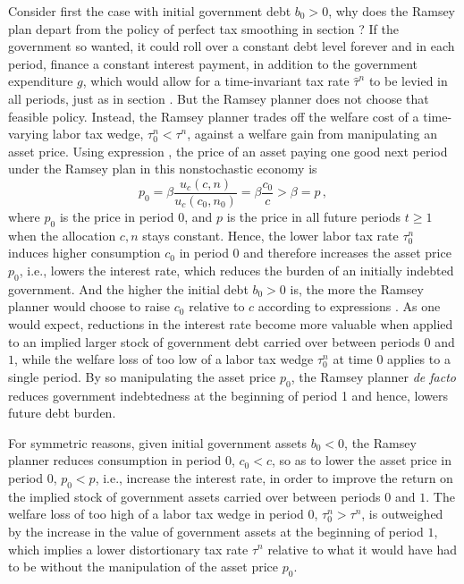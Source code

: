 Consider first the case with initial government debt $b_0>0$, why 
does the Ramsey plan depart from the policy of perfect tax 
smoothing in section ? If the government 
so wanted, it could roll over a constant debt level forever and 
in each period, finance a constant interest payment, in 
addition to the government expenditure $g$, which would
allow for a time-invariant tax rate $\hat \tau^n$ to be levied
in all periods, just as in section . But the 
Ramsey planner does not choose that feasible policy. Instead, the 
Ramsey planner trades off the welfare cost of a time-varying labor 
tax wedge, $\tau^n_0 < \tau^n$, against a welfare gain from 
manipulating an asset price. Using expression , the
price of an asset paying one good next period under the Ramsey plan
in this nonstochastic economy is 
$$
p_0=\beta {\frac{u_c(c,n)}{u_c(c_0,n_0)}} = \beta {\frac{c_0}{c}}
 > \beta = p\,,
$$
where $p_0$ is the price in period $0$, and $p$ is the price in
all future periods $t\geq 1$ when the allocation $c,n$ stays
constant. Hence, the lower labor tax rate $\tau^n_0$ induces 
higher consumption $c_0$ in period $0$ and therefore increases 
the asset price $p_0$, i.e., lowers the interest rate,
which reduces the burden of an initially indebted government.  
And the higher the initial debt $b_0>0$ is, the more the Ramsey 
planner would choose to raise $c_0$ relative to $c$ according to
expressions .
As one would expect, reductions in the interest rate become
more valuable when applied to an implied larger stock of government 
debt carried over between periods $0$ and $1$, while the welfare 
loss of too low of a labor tax wedge $\tau^n_0$ at time $0$ applies 
to a single period. By so manipulating the asset price $p_0$, the 
Ramsey planner {\it de facto} reduces government indebtedness at 
the beginning of period 1 and hence, lowers future debt burden.

For symmetric reasons, given initial government assets $b_0<0$, the 
Ramsey planner reduces consumption in period $0$,
$c_0 < c$, so as to lower the asset price in period $0$, $p_0<p$, 
i.e., increase the interest rate, in order to improve the return on 
the implied stock of government assets carried over between periods 
$0$ and $1$. The welfare loss of too high of a labor tax wedge in
period $0$, $\tau^n_0 > \tau^n$, is outweighed by the increase in the
value of government assets at the beginning of period $1$, which 
implies a lower distortionary tax rate $\tau^n$
relative to what it would have had to be without the manipulation
of the asset price $p_0$.

